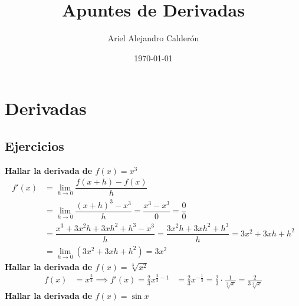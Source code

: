\documentclass[12pt,a4paper,fleqn]{article}
\title{Apuntes de Derivadas}
\author{Ariel Alejandro Calderón}
\date{\today}
\begin{document}
\maketitle

\newpage
\tableofcontents
\newpage

\section{Derivadas}
\subsection{Ejercicios}
\textbf{Hallar la derivada de $f(x)=x^3$}
\begin{align*}
	f'(x) & = \lim_{h \to 0} \dfrac{f(x+h) - f(x)}{h}                                                        \\
	      & = \lim_{h \to 0} \dfrac{(x+h)^3 - x^3}{h} = \dfrac{x^3 - x^3}{0} = \dfrac{0}{0}                  \\
	      & = \dfrac{x^3 + 3x^2h + 3xh^2 + h^3 - x^3}{h} = \dfrac{3x^2h + 3xh^2 + h^3}{h} = 3x^2 + 3xh + h^2 \\
	      & = \lim_{h \to 0} (3x^2 + 3xh + h^2) = 3x^2
\end{align*}
\textbf{Hallar la derivada de $f(x)=\sqrt[3]{x^2}$}
\begin{align*}
	f(x) & = x^{\frac{2}{3}} \implies f'(x)= \frac{2}{3}x^{\frac{2}{3}-1}
	     & = \frac{2}{3}x^{-\frac{1}{3}}=\frac{2}{3}\cdot\frac{1}{\sqrt[3]{x}}=\frac{2}{3\sqrt[3]{x}}
\end{align*}
\textbf{Hallar la derivada de $f(x)= \sin x$}\\[10pt]
\end{document}
